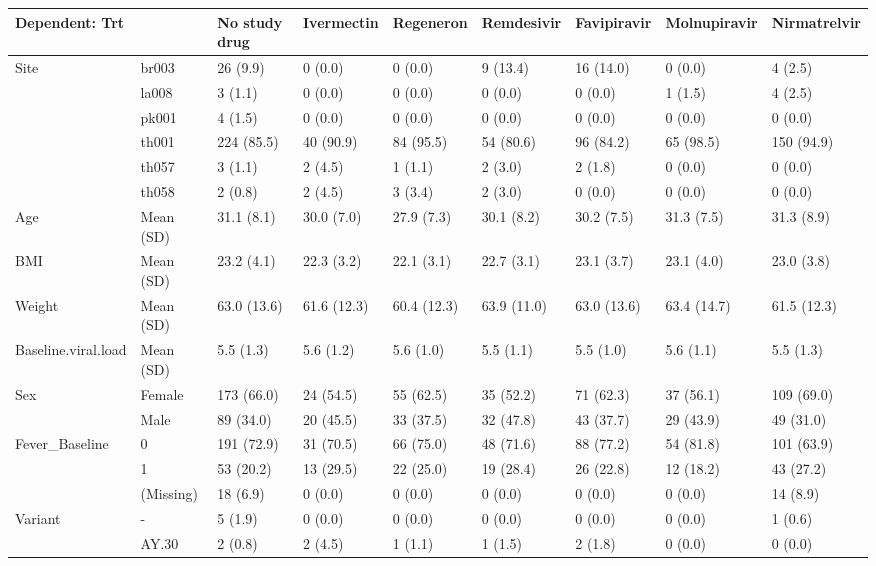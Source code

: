 
\begin{tabular}{l|l|l|l|l|l|l|l|l}
\hline
Dependent: Trt &   & No study drug & Ivermectin & Regeneron & Remdesivir & Favipiravir & Molnupiravir & Nirmatrelvir\\
\hline
Site & br003 & 26 (9.9) & 0 (0.0) & 0 (0.0) & 9 (13.4) & 16 (14.0) & 0 (0.0) & 4 (2.5)\\
\hline
 & la008 & 3 (1.1) & 0 (0.0) & 0 (0.0) & 0 (0.0) & 0 (0.0) & 1 (1.5) & 4 (2.5)\\
\hline
 & pk001 & 4 (1.5) & 0 (0.0) & 0 (0.0) & 0 (0.0) & 0 (0.0) & 0 (0.0) & 0 (0.0)\\
\hline
 & th001 & 224 (85.5) & 40 (90.9) & 84 (95.5) & 54 (80.6) & 96 (84.2) & 65 (98.5) & 150 (94.9)\\
\hline
 & th057 & 3 (1.1) & 2 (4.5) & 1 (1.1) & 2 (3.0) & 2 (1.8) & 0 (0.0) & 0 (0.0)\\
\hline
 & th058 & 2 (0.8) & 2 (4.5) & 3 (3.4) & 2 (3.0) & 0 (0.0) & 0 (0.0) & 0 (0.0)\\
\hline
Age & Mean (SD) & 31.1 (8.1) & 30.0 (7.0) & 27.9 (7.3) & 30.1 (8.2) & 30.2 (7.5) & 31.3 (7.5) & 31.3 (8.9)\\
\hline
BMI & Mean (SD) & 23.2 (4.1) & 22.3 (3.2) & 22.1 (3.1) & 22.7 (3.1) & 23.1 (3.7) & 23.1 (4.0) & 23.0 (3.8)\\
\hline
Weight & Mean (SD) & 63.0 (13.6) & 61.6 (12.3) & 60.4 (12.3) & 63.9 (11.0) & 63.0 (13.6) & 63.4 (14.7) & 61.5 (12.3)\\
\hline
Baseline.viral.load & Mean (SD) & 5.5 (1.3) & 5.6 (1.2) & 5.6 (1.0) & 5.5 (1.1) & 5.5 (1.0) & 5.6 (1.1) & 5.5 (1.3)\\
\hline
Sex & Female & 173 (66.0) & 24 (54.5) & 55 (62.5) & 35 (52.2) & 71 (62.3) & 37 (56.1) & 109 (69.0)\\
\hline
 & Male & 89 (34.0) & 20 (45.5) & 33 (37.5) & 32 (47.8) & 43 (37.7) & 29 (43.9) & 49 (31.0)\\
\hline
Fever\_Baseline & 0 & 191 (72.9) & 31 (70.5) & 66 (75.0) & 48 (71.6) & 88 (77.2) & 54 (81.8) & 101 (63.9)\\
\hline
 & 1 & 53 (20.2) & 13 (29.5) & 22 (25.0) & 19 (28.4) & 26 (22.8) & 12 (18.2) & 43 (27.2)\\
\hline
 & (Missing) & 18 (6.9) & 0 (0.0) & 0 (0.0) & 0 (0.0) & 0 (0.0) & 0 (0.0) & 14 (8.9)\\
\hline
Variant & - & 5 (1.9) & 0 (0.0) & 0 (0.0) & 0 (0.0) & 0 (0.0) & 0 (0.0) & 1 (0.6)\\
\hline
 & AY.30 & 2 (0.8) & 2 (4.5) & 1 (1.1) & 1 (1.5) & 2 (1.8) & 0 (0.0) & 0 (0.0)\\

\end{tabular}
